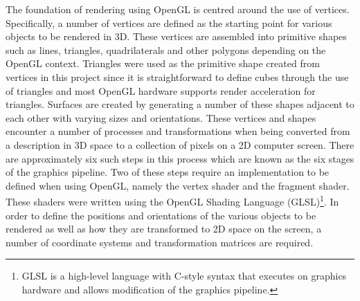 The foundation of rendering using OpenGL is centred around the use of vertices. Specifically, a number of vertices are defined as the starting point for various objects to be rendered in 3D. These vertices are assembled into primitive shapes such as lines, triangles, quadrilaterals and other polygons depending on the OpenGL context. Triangles were used as the primitive shape created from vertices in this project since it is straightforward to define cubes through the use of triangles and most OpenGL hardware supports render acceleration for triangles. Surfaces are created by generating a number of these shapes adjacent to each other with varying sizes and orientations. These vertices and shapes encounter a number of processes and transformations when being converted from a description in 3D space to a collection of pixels on a 2D computer screen. There are approximately six such steps in this process which are known as the six stages of the graphics pipeline. Two of these steps require an implementation to be defined when using OpenGL, namely the vertex shader and the fragment shader. These shaders were written using the  OpenGL Shading Language (GLSL)\footnote{GLSL is a high-level language with C-style syntax that executes on graphics hardware and allows modification of the graphics pipeline.}. In order to define the positions and orientations of the various objects to be rendered as well as how they are transformed to 2D space on the screen, a number of coordinate systems and transformation matrices are required.




